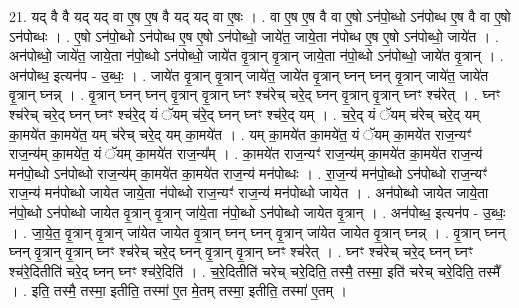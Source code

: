 \documentclass[17pt]{extarticle}
\begin{document}
21. यद् वै वै यद् यद् वा ए॒ष ए॒ष वै यद् यद् वा ए॒षः । . वा ए॒ष ए॒ष वै वा ए॒षो ऽन॑पो॒ब्धो ऽन॑पोब्ध ए॒ष वै वा ए॒षो ऽन॑पोब्धः । . ए॒षो ऽन॑पो॒ब्धो ऽन॑पोब्ध ए॒ष ए॒षो ऽन॑पोब्धो॒ जाये॑त॒ जाये॒ता न॑पोब्ध ए॒ष ए॒षो ऽन॑पोब्धो॒ जाये॑त । . अन॑पोब्धो॒ जाये॑त॒ जाये॒ता न॑पो॒ब्धो ऽन॑पोब्धो॒ जाये॑त वृ॒त्रान् वृ॒त्रान् जाये॒ता न॑पो॒ब्धो ऽन॑पोब्धो॒ जाये॑त वृ॒त्रान् । . अन॑पोब्ध॒ इत्यन॑प - उ॒ब्धः॒ । . जाये॑त वृ॒त्रान् वृ॒त्रान् जाये॑त॒ जाये॑त वृ॒त्रान् घ्नन् घ्नन् वृ॒त्रान् जाये॑त॒ जाये॑त वृ॒त्रान् घ्नन्न् । . वृ॒त्रान् घ्नन् घ्नन् वृ॒त्रान् वृ॒त्रान् घ्नꣳ श्च॑रेच् चरे॒द् घ्नन् वृ॒त्रान् वृ॒त्रान् घ्नꣳ श्च॑रेत् । . घ्नꣳ श्च॑रेच् चरे॒द् घ्नन् घ्नꣳ श्च॑रे॒द् यं ॅयम् च॑रे॒द् घ्नन् घ्नꣳ श्च॑रे॒द् यम् । . च॒रे॒द् यं ॅयम् च॑रेच् चरे॒द् यम् का॒मये॑त का॒मये॑त॒ यम् च॑रेच् चरे॒द् यम् का॒मये॑त । . यम् का॒मये॑त का॒मये॑त॒ यं ॅयम् का॒मये॑त राज॒न्यꣳ॑ राज॒न्य॑म् का॒मये॑त॒ यं ॅयम् का॒मये॑त राज॒न्य᳚म् । . का॒मये॑त राज॒न्यꣳ॑ राज॒न्य॑म् का॒मये॑त का॒मये॑त राज॒न्य॑ मन॑पो॒ब्धो ऽन॑पोब्धो राज॒न्य॑म् का॒मये॑त का॒मये॑त राज॒न्य॑ मन॑पोब्धः । . रा॒ज॒न्य॑ मन॑पो॒ब्धो ऽन॑पोब्धो राज॒न्यꣳ॑ राज॒न्य॑ मन॑पोब्धो जायेत जाये॒ता न॑पोब्धो राज॒न्यꣳ॑ राज॒न्य॑ मन॑पोब्धो जायेत । . अन॑पोब्धो जायेत जाये॒ता न॑पो॒ब्धो ऽन॑पोब्धो जायेत वृ॒त्रान् वृ॒त्रान् जा॑ये॒ता न॑पो॒ब्धो ऽन॑पोब्धो जायेत वृ॒त्रान् । . अन॑पोब्ध॒ इत्यन॑प - उ॒ब्धः॒ । . जा॒ये॒त॒ वृ॒त्रान् वृ॒त्रान् जा॑येत जायेत वृ॒त्रान् घ्नन् घ्नन् वृ॒त्रान् जा॑येत जायेत वृ॒त्रान् घ्नन्न् । . वृ॒त्रान् घ्नन् घ्नन् वृ॒त्रान् वृ॒त्रान् घ्नꣳ श्च॑रेच् चरे॒द् घ्नन् वृ॒त्रान् वृ॒त्रान् घ्नꣳ श्च॑रेत् । . घ्नꣳ श्च॑रेच् चरे॒द् घ्नन् घ्नꣳ श्च॑रे॒दितीति॑ चरे॒द् घ्नन् घ्नꣳ श्च॑रे॒दिति॑ । . च॒रे॒दितीति॑ चरेच् चरे॒दिति॒ तस्मै॒ तस्मा॒ इति॑ चरेच् चरे॒दिति॒ तस्मै᳚ । . इति॒ तस्मै॒ तस्मा॒ इतीति॒ तस्मा॑ ए॒त मे॒तम् तस्मा॒ इतीति॒ तस्मा॑ ए॒तम् । \newline
\end{document}
